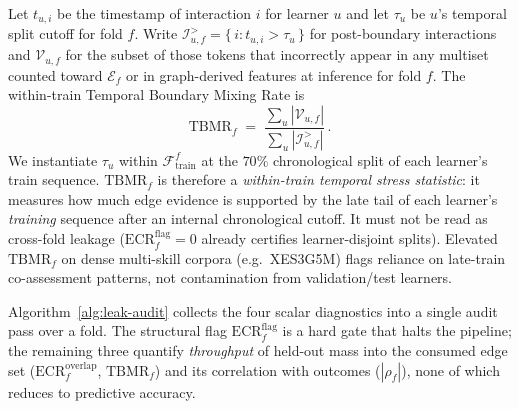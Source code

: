 \documentclass[pdflatex,sn-mathphys-num]{sn-jnl}
\begin{document}
Let $t_{u,i}$ be the timestamp of interaction $i$ for learner $u$ and
let $\tau_u$ be $u$'s temporal split cutoff for fold $f$. Write
$\mathcal{I}_{u,f}^{>}=\{\, i : t_{u,i}>\tau_u \,\}$ for post-boundary
interactions and $\mathcal{V}_{u,f}$ for the subset of those tokens that
incorrectly appear in any multiset counted toward $\mathcal{E}_f$ or in
graph-derived features at inference for fold $f$. The within-train
Temporal Boundary Mixing Rate is
\begin{equation}
\mathrm{TBMR}_f \;=\;
\frac{\sum_u |\mathcal{V}_{u,f}|}{\sum_u |\mathcal{I}_{u,f}^{>}|}\,.
\label{eq:tbvr}
\end{equation}
We instantiate $\tau_u$ within $\mathcal{F}_{\text{train}}^f$ at the
$70\%$ chronological split of each learner's train sequence.
$\mathrm{TBMR}_f$ is therefore a \emph{within-train temporal stress
statistic}: it measures how much edge evidence is supported by the late tail
of each learner's \emph{training} sequence after an internal chronological
cutoff. It must not be read as cross-fold leakage
($\mathrm{ECR}^{\mathrm{flag}}_f{=}0$ already certifies learner-disjoint
splits). Elevated $\mathrm{TBMR}_f$ on dense multi-skill corpora (e.g.\
XES3G5M) flags reliance on late-train co-assessment patterns, not contamination
from validation/test learners.

Algorithm~\ref{alg:leak-audit} collects the four scalar diagnostics into a
single audit pass over a fold. The structural flag $\mathrm{ECR}^{\mathrm{flag}}_f$
is a hard gate that halts the pipeline; the remaining three quantify
\emph{throughput} of held-out mass into the consumed edge set
($\mathrm{ECR}^{\mathrm{overlap}}_f$, $\mathrm{TBMR}_f$) and its correlation
with outcomes ($|\rho_f|$), none of which reduces to predictive accuracy.
\end{document}
